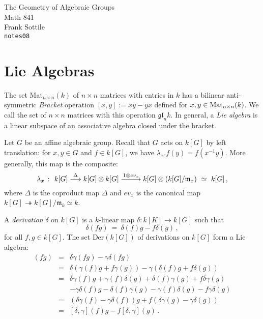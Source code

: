 \documentclass[12pt]{amsart}
\def\silentfootnote#1{{\let\thefootnote\relax\footnotetext{#1}}}
\newcommand{\lra}{\relbar\joinrel\relbar\joinrel\longrightarrow}
\begin{document}
\begin{center}
\Large
The Geometry of Algebraic Groups\\
\large
Math 841\\
Frank Sottile\\
{\tt notes08}
\end{center}\bigskip

\silentfootnote{\sl Version of 9 April 2000} 

\section{Lie Algebras}


The set Mat$_{n\times n}(k)$ of $n\times n$ matrices with entries in $k$ 
has a bilinear anti-symmetric {\sl Bracket} operation $[x,y]:=xy -yx$
defined for $x,y\in\mbox{\rm Mat}_{n\times n}(k)$.
We call the set of $n\times n$ matrices with this operation 
${\mathfrak{g}\mathfrak{l}}_nk$.
In general, a {\sl Lie algebra} is a linear subspace of an associative
algebra closed under the bracket.
\medskip


Let $G$ be an affine algebraic group.
Recall that $G$ acts on $k[G]$ by left translation:
for $x,y\in G$ and $f\in k[G]$, we have $\lambda_x.f(y)=f(x^{-1}y)$.
More generally, this map is the composite:
$$
   \lambda_x\ \colon\ 
    k[G] \stackrel{\Delta}{\longrightarrow} k[G]\otimes k[G]
    \stackrel{1\otimes ev_x}{\lra}
    k[G]\otimes (k[G]/{\mathfrak m}_x)\ \simeq\ k[G]\,,
$$
where $\Delta$ is the coproduct map $\Delta$ and $ev_x$ is the canonical map
$k[G]\twoheadrightarrow k[G]/{\mathfrak m}_k\simeq k$.


A {\sl derivation} $\delta$ on $k[G]$ is a $k$-linear map
$\delta\colon k[K]\to k[G]$ such that 
$$
  \delta(fg)\ =\ \delta(f)g - f \delta(g)\,,
$$
for all $f,g\in k[G]$.
The set $\mbox{Der}(k[G])$ of derivations on $k[G]$ form a Lie algebra:
\begin{eqnarray*}
[\delta,\gamma](fg)&=& \delta\gamma(fg)-\gamma\delta(fg)\\
&=& \delta(\gamma(f)g+f\gamma(g))-\gamma(\delta(f)g+f\delta(g))\\
&=& \delta\gamma(f)g + \gamma(f)\delta(g) + \delta(f)\gamma(g)
    + f\delta\gamma(g)\\
&& - \gamma\delta(f)g - \delta(f)\gamma(g) - \gamma(f)\delta(g) 
    - f\gamma\delta(g)\\
&=& (\delta\gamma(f)-\gamma\delta(f))g +
    f(\delta\gamma(g)-\gamma\delta(g))\\
&=& [\delta,\gamma](f) g - f [\delta,\gamma](g)\,.
\end{eqnarray*}
\end{document}

